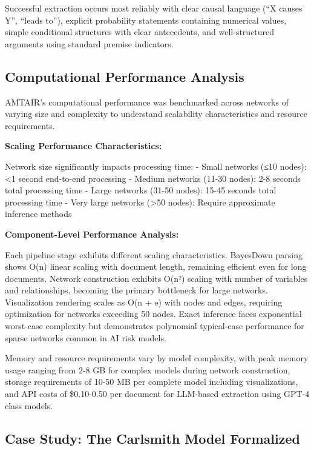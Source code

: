 \documentclass[
  11pt,
  letterpaper,
]{book}
\begin{document}
Successful extraction occurs most reliably with clear causal language
(``X causes Y'', ``leads to''), explicit probability statements
containing numerical values, simple conditional structures with clear
antecedents, and well-structured arguments using standard premise
indicators.

\subsection{Computational Performance
Analysis}\label{sec-computational-performance}

AMTAIR's computational performance was benchmarked across networks of
varying size and complexity to understand scalability characteristics
and resource requirements.

\textbf{Scaling Performance Characteristics:}

Network size significantly impacts processing time: - Small networks
(≤10 nodes): \textless1 second end-to-end processing - Medium networks
(11-30 nodes): 2-8 seconds total processing time - Large networks (31-50
nodes): 15-45 seconds total processing time - Very large networks
(\textgreater50 nodes): Require approximate inference methods

\textbf{Component-Level Performance Analysis:}

Each pipeline stage exhibits different scaling characteristics.
BayesDown parsing shows O(n) linear scaling with document length,
remaining efficient even for long documents. Network construction
exhibits O(n²) scaling with number of variables and relationships,
becoming the primary bottleneck for large networks. Visualization
rendering scales as O(n + e) with nodes and edges, requiring
optimization for networks exceeding 50 nodes. Exact inference faces
exponential worst-case complexity but demonstrates polynomial
typical-case performance for sparse networks common in AI risk models.

Memory and resource requirements vary by model complexity, with peak
memory usage ranging from 2-8 GB for complex models during network
construction, storage requirements of 10-50 MB per complete model
including visualizations, and API costs of \$0.10-0.50 per document for
LLM-based extraction using GPT-4 class models.

\subsection{Case Study: The Carlsmith Model
Formalized}\label{sec-carlsmith-case-study}
\end{document}
